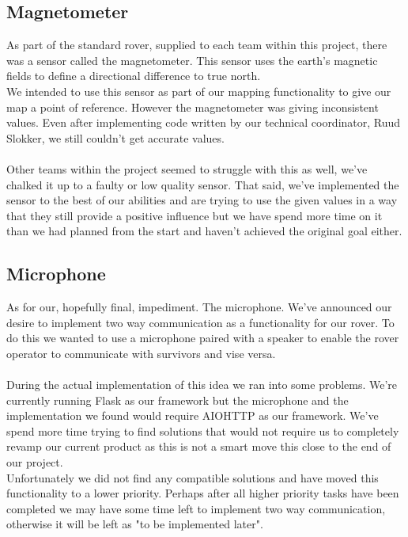 \documentclass[12pt]{article}
\begin{document}
	\subsection{Magnetometer}
	As part of the standard rover, supplied to each team within this project, there was a sensor called the magnetometer. This sensor uses the earth's magnetic fields to define a directional difference to true north.\\
	We intended to use this sensor as part of our mapping functionality to give our map a point of reference. However the magnetometer was giving inconsistent values. Even after implementing code written by our technical coordinator, Ruud Slokker, we still couldn't get accurate values.\\
	\\Other teams within the project seemed to struggle with this as well, we've chalked it up to a faulty or low quality sensor. That said, we've implemented the sensor to the best of our abilities and are trying to use the given values in a way that they still provide a positive influence but we have spend more time on it than we had planned from the start and haven't achieved the original goal either.
	\subsection{Microphone}
	As for our, hopefully final, impediment. The microphone. We've announced our desire to implement two way communication as a functionality for our rover. To do this we wanted to use a microphone paired with a speaker to enable the rover operator to communicate with survivors and vise versa.\\
	\\During the actual implementation of this idea we ran into some problems. We're currently running Flask as our framework but the microphone and the implementation we found would require AIOHTTP as our framework. We've spend more time trying to find solutions that would not require us to completely revamp our current product as this is not a smart move this close to the end of our project.\\
	Unfortunately we did not find any compatible solutions and have moved this functionality to a lower priority. Perhaps after all higher priority tasks have been completed we may have some time left to implement two way communication, otherwise it will be left as "to be implemented later". 
	\newpage
\end{document}
